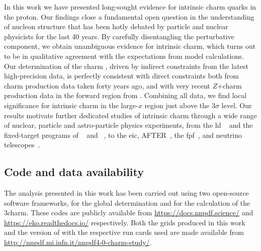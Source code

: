 
In this work we have presented long-sought evidence for intrinsic charm quarks
in the proton.
%
Our findings close a fundamental open question in the understanding of nucleon
structure that has been hotly debated by particle and nuclear physicists for
the last 40 years.
%
By carefully disentangling the perturbative component, we obtain unambiguous
evidence for intrinsic charm, which turns out to be in qualitative agreement
with the expectations from model calculations.
%
Our determination of the charm \pdf, driven by indirect constraints from the 
latest high-precision \lhc data, is perfectly consistent with direct constraints
both from \emc charm production data taken forty years   ago, and with very
recent $Z$+charm production data in the forward region from \lhcb.
%
Combining all data, we find local significance for intrinsic charm in the
large-$x$ region just above the $3\sigma$ level.
%
Our results motivate further dedicated studies of intrinsic charm through a
wide range of nuclear, particle and astro-particle physics experiments, from
the \acrlong{hl} \lhc~\cite{Azzi:2019yne} and the fixed-target programs of
\lhcb~\cite{LHCb:2018jry} and \alice~\cite{QCDWorkingGroup:2019dyv}, to the  
\acrlong{eic}, AFTER~\cite{Hadjidakis:2018ifr}, the
\acrlong{fpf}~\cite{Anchordoqui:2021ghd}, and neutrino
telescopes~\cite{Halzen:2016thi}.

\subsection*{Code and data availability}

The analysis presented in this work has been carried out using two open-source
software frameworks,  for the global \pdf determination and \eko for
the calculation of the 3\fns charm.
%
These codes are publicly available from \url{https://docs.nnpdf.science/} and
\url{https://eko.readthedocs.io/} respectively.
%
Both the \lhapdf grids produced in this work and the version of \eko with the
respective run cards used are made available from
\url{http://nnpdf.mi.infn.it/nnpdf4-0-charm-study/}.
